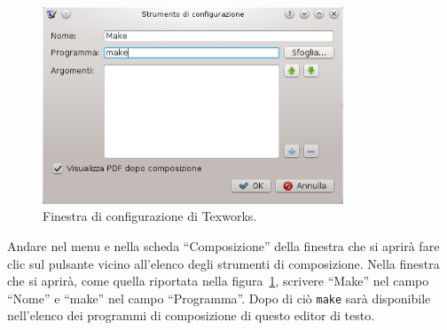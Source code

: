 \begin{figure}
  \centering
  \includegraphics[width=0.8\textwidth]{figure/texworks}
  \caption{Finestra di configurazione di Texworks.}
  \label{fig:texworks}
\end{figure}
Andare nel menu  e nella scheda ``Composizione''
della finestra che si aprirà fare clic sul pulsante \keys{{+}} vicino all'elenco
degli strumenti di composizione.  Nella finestra che si aprirà, come quella
riportata nella figura~\ref{fig:texworks}, scrivere ``Make'' nel campo ``Nome''
e ``make'' nel campo ``Programma''.  Dopo di ciò \texttt{make} sarà disponibile
nell'elenco dei programmi di composizione di questo editor di testo.

